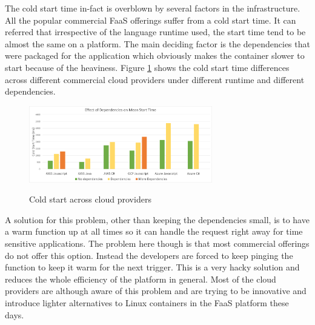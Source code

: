 \documentclass[12pt,titlepage]{article}
\begin{document}
The cold start time in-fact is overblown by several factors in the
infrastructure. All the popular commercial FaaS offerings suffer from a cold
start time. It can referred that irrespective of the language runtime used, the
start time tend to be almost the same on a platform. The main deciding factor is
the dependencies that were packaged for the application which obviously makes
the container slower to start because of the heaviness. Figure  \ref{fig:cold_strt} shows the cold
start time differences across different commercial cloud providers under
different runtime and different dependencies.

\begin{figure}[!h]
    \caption{Cold start across cloud providers}
    \centering
    \includegraphics[width=80mm]{./thesis_images/cold_start.png}
    \label{fig:cold_strt}
\end{figure}

A solution for this problem, other than keeping the dependencies small, is to
have a warm function up at all times so it can handle the request right away for
time sensitive applications. The problem here though is that most commercial
offerings do not offer this option. Instead the developers are forced to keep
pinging the function to keep it warm for the next trigger. This is a very hacky
solution and reduces the whole efficiency of the platform in general. Most of
the cloud providers are although aware of this problem and are trying to be
innovative and introduce lighter alternatives to Linux containers in the FaaS
platform these days.
\end{document}
